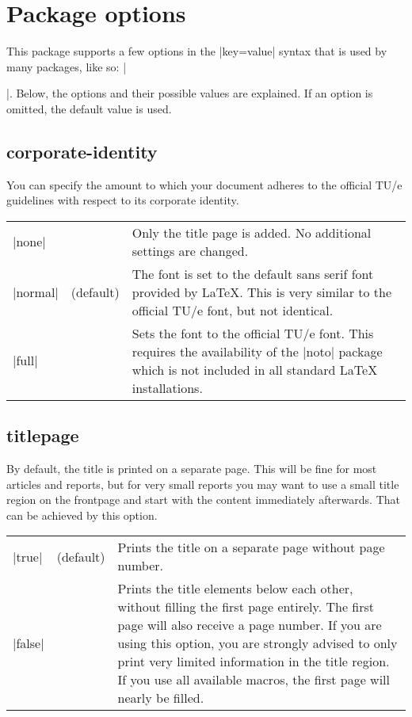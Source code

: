 \section{Package options}
\label{sec:package-options}
This package supports a few options in the |key=value| syntax that is used by many packages, like so: |\usepackage[key1=value1, key2=value2]{tu/e}|. Below, the options and their possible values are explained. If an option is omitted, the default value is used.

\subsection{corporate-identity}
You can specify the amount to which your document adheres to the official TU/e guidelines with respect to its corporate identity.

\begin{tabularx}{\textwidth}{llX} \toprule
  |none| & & Only the title page is added. No additional settings are changed. \\
  |normal| & (default) & The font is set to the default sans serif font provided by \LaTeX{}. This is very similar to the official TU/e font, but not identical. \\
  |full| & & Sets the font to the official TU/e font. This requires the availability of the |noto| package which is not included in all standard \LaTeX{} installations. \\ \bottomrule
\end{tabularx}

\subsection{titlepage}
By default, the title is printed on a separate page. This will be fine for most articles and reports, but for very small reports you may want to use a small title region on the frontpage and start with the content immediately afterwards. That can be achieved by this option.

\begin{tabularx}{\textwidth}{llX} \toprule
  |true| & (default) & Prints the title on a separate page without page number. \\
  |false| & & Prints the title elements below each other, without filling the first page entirely. The first page will also receive a page number. If you are using this option, you are strongly advised to only print very limited information in the title region. If you use all available macros, the first page will nearly be filled. \\ \bottomrule
\end{tabularx}

